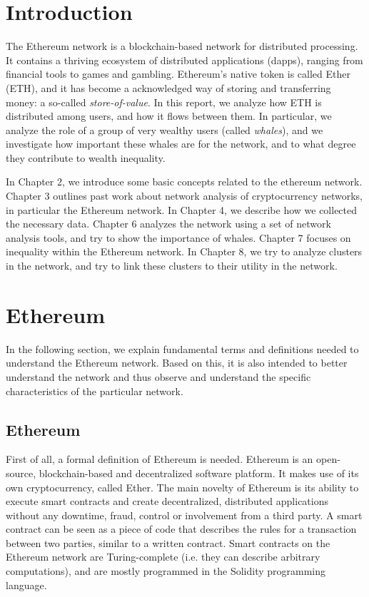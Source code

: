 \documentclass[10pt,a4paper]{article}
\begin{document}
\begin{multicols}{2}

\section{Introduction}
The Ethereum network is a blockchain-based network for distributed processing. It contains a thriving ecosystem of distributed applications (dapps), ranging from financial tools to games and gambling. Ethereum's native token is called Ether (ETH), and it has become a acknowledged way of storing and transferring money: a so-called \textit{store-of-value}. In this report, we analyze how ETH is distributed among users, and how it flows between them. In particular, we analyze the role of a group of very wealthy users (called \textit{whales}), and we investigate how important these whales are for the network, and to what degree they contribute to wealth inequality.

In Chapter 2, we introduce some basic concepts related to the ethereum network. Chapter 3 outlines past work about network analysis of cryptocurrency networks, in particular the Ethereum network. In Chapter 4, we describe how we collected the necessary data. Chapter 6 analyzes the network using a set of network analysis tools, and try to show the importance of whales. Chapter 7 focuses on inequality within the Ethereum network. In Chapter 8, we try to analyze clusters in the network, and try to link these clusters to their utility in the network. 

\section{Ethereum}

In the following section, we explain fundamental terms and definitions needed to understand the Ethereum network. Based on this, it is also intended to better understand the network and thus observe and understand the specific characteristics of the particular network. 

\subsection{Ethereum}
First of all, a formal definition of Ethereum is needed. Ethereum is an open-source, blockchain-based and decentralized software platform. It makes use of its own cryptocurrency, called Ether. The main novelty of Ethereum is its ability to execute smart contracts and create decentralized, distributed applications without any downtime, fraud, control or involvement from a third party. A smart contract can be seen as a piece of code that describes the rules for a transaction between two parties, similar to a written contract. Smart contracts on the Ethereum network are Turing-complete (i.e. they can describe arbitrary computations), and are mostly programmed in the Solidity programming language. 

\end{multicols}
\end{document}
